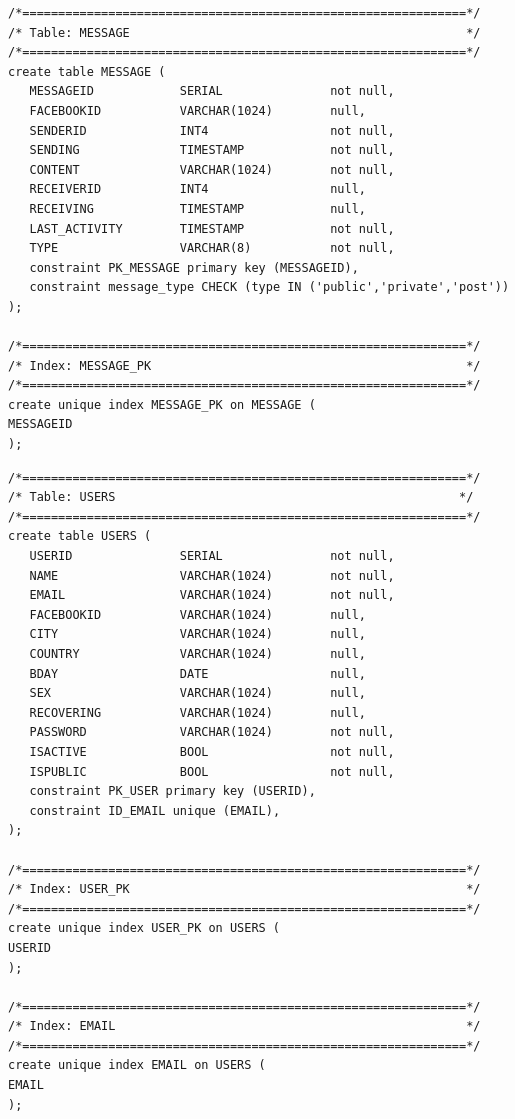 \documentclass[a4paper, 12pt]{article}
\begin{document}
\cleardoublepage
\begin{verbatim}
/*==============================================================*/
/* Table: MESSAGE                                               */
/*==============================================================*/
create table MESSAGE (
   MESSAGEID            SERIAL               not null,
   FACEBOOKID           VARCHAR(1024)        null,
   SENDERID             INT4                 not null,
   SENDING              TIMESTAMP            not null,
   CONTENT              VARCHAR(1024)        not null,
   RECEIVERID           INT4                 null,
   RECEIVING            TIMESTAMP            null,
   LAST_ACTIVITY        TIMESTAMP            not null,
   TYPE                 VARCHAR(8)           not null,
   constraint PK_MESSAGE primary key (MESSAGEID),
   constraint message_type CHECK (type IN ('public','private','post'))
);

/*==============================================================*/
/* Index: MESSAGE_PK                                            */
/*==============================================================*/
create unique index MESSAGE_PK on MESSAGE (
MESSAGEID
);
\end{verbatim}
\cleardoublepage
\begin{verbatim}
/*==============================================================*/
/* Table: USERS                                                */
/*==============================================================*/
create table USERS (
   USERID               SERIAL               not null,
   NAME                 VARCHAR(1024)        not null,
   EMAIL                VARCHAR(1024)        not null,
   FACEBOOKID           VARCHAR(1024)        null,
   CITY                 VARCHAR(1024)        null,
   COUNTRY              VARCHAR(1024)        null,
   BDAY                 DATE                 null,
   SEX                  VARCHAR(1024)        null,
   RECOVERING           VARCHAR(1024)        null,
   PASSWORD             VARCHAR(1024)        not null,
   ISACTIVE             BOOL                 not null,
   ISPUBLIC             BOOL                 not null,
   constraint PK_USER primary key (USERID),
   constraint ID_EMAIL unique (EMAIL),
);

/*==============================================================*/
/* Index: USER_PK                                               */
/*==============================================================*/
create unique index USER_PK on USERS (
USERID
);

/*==============================================================*/
/* Index: EMAIL                                                 */
/*==============================================================*/
create unique index EMAIL on USERS (
EMAIL
);
\end{verbatim}
\end{document}

